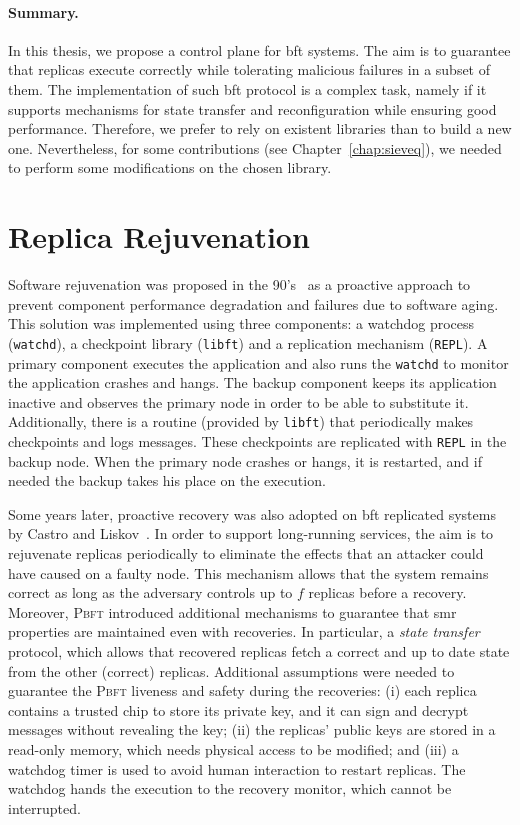 \paragraph{Summary.} 

In this thesis, we propose a control plane for \gls{bft} systems.
The aim is to guarantee that replicas execute correctly while tolerating malicious failures in a subset of them.
The implementation of such \gls{bft} protocol is a complex task, namely if it supports mechanisms for state transfer and reconfiguration while ensuring good performance.
Therefore, we prefer to rely on existent libraries than to build a new one.
Nevertheless, for some contributions (see Chapter~\ref{chap:sieveq}), we needed to perform some modifications on the chosen library.



\section{Replica Rejuvenation}
Software rejuvenation was proposed in the 90's~\cite{Huang:1993,Huang:1995} as a proactive approach to prevent component performance degradation and failures due to software aging. 
This solution was implemented using three components: a watchdog process (\texttt{watchd}), a checkpoint library (\texttt{libft}) and a replication mechanism (\texttt{REPL}). 
A primary component executes the application and also runs the \texttt{watchd} to monitor the application crashes and hangs. 
The backup component keeps its application inactive and observes the primary node in order to be able to substitute it. 
Additionally, there is a routine (provided by \texttt{libft}) that periodically makes checkpoints and logs messages. 
These checkpoints are replicated with \texttt{REPL} in the backup node. 
When the primary node crashes or hangs, it is restarted, and if needed the backup takes his place on the execution.


Some years later, proactive recovery was also adopted on \gls{bft} replicated systems by Castro and Liskov~\cite{Castro:2002}.
In order to support long-running services, the aim is to rejuvenate replicas periodically to eliminate the effects that an attacker could have caused on a faulty node. 
This mechanism allows that the system remains correct as long as the adversary controls up to $f$ replicas before a recovery.
Moreover, \textsc{Pbft} introduced additional mechanisms to guarantee that \gls{smr} properties are maintained even with recoveries.
In particular, a \emph{state transfer} protocol, which allows that recovered replicas fetch a correct and up to date state from the other (correct) replicas.
Additional assumptions were needed to guarantee the \textsc{Pbft} liveness and safety during the recoveries: 
(i) each replica contains a trusted chip to store its private key, and it can sign and decrypt messages without revealing the key; 
(ii) the replicas' public keys are stored in a read-only memory, which needs physical access to be modified; 
and (iii) a watchdog timer is used to avoid human interaction to restart replicas. 
The watchdog hands the execution to the recovery monitor, which cannot be interrupted.

